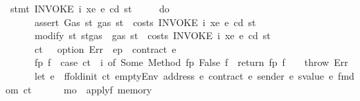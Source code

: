\begin{isabellebody}
{\isacharbar}{\kern0pt}\ {\isachardoublequoteopen}stmt\ {\isacharparenleft}{\kern0pt}INVOKE\ i\ xe{\isacharparenright}{\kern0pt}\ e\ cd\ st\ {\isacharequal}{\kern0pt}\isanewline
\ \ \ \ {\isacharparenleft}{\kern0pt}do\ {\isacharbraceleft}{\kern0pt}\isanewline
\ \ \ \ \ \ assert\ Gas\ {\isacharparenleft}{\kern0pt}{\isasymlambda}st{\isachardot}{\kern0pt}\ gas\ st\ {\isachargreater}{\kern0pt}\ costs\ {\isacharparenleft}{\kern0pt}INVOKE\ i\ xe{\isacharparenright}{\kern0pt}\ e\ cd\ st{\isacharparenright}{\kern0pt}{\isacharsemicolon}{\kern0pt}\isanewline
\ \ \ \ \ \ modify\ {\isacharparenleft}{\kern0pt}{\isasymlambda}st{\isachardot}{\kern0pt}\ st{\isasymlparr}gas\ {\isacharcolon}{\kern0pt}{\isacharequal}{\kern0pt}\ gas\ st\ {\isacharminus}{\kern0pt}\ costs\ {\isacharparenleft}{\kern0pt}INVOKE\ i\ xe{\isacharparenright}{\kern0pt}\ e\ cd\ st{\isasymrparr}{\isacharparenright}{\kern0pt}{\isacharsemicolon}{\kern0pt}\isanewline
\ \ \ \ \ \ {\isacharparenleft}{\kern0pt}ct{\isacharcomma}{\kern0pt}\ {\isacharunderscore}{\kern0pt}{\isacharparenright}{\kern0pt}\ {\isasymleftarrow}\ option\ Err\ {\isacharparenleft}{\kern0pt}{\isasymlambda}{\isacharunderscore}{\kern0pt}{\isachardot}{\kern0pt}\ ep\ {\isachardollar}{\kern0pt}{\isachardollar}{\kern0pt}\ contract\ e{\isacharparenright}{\kern0pt}{\isacharsemicolon}{\kern0pt}\isanewline
\ \ \ \ \ \ {\isacharparenleft}{\kern0pt}fp{\isacharcomma}{\kern0pt}\ f{\isacharparenright}{\kern0pt}\ {\isasymleftarrow}\ case\ ct\ {\isachardollar}{\kern0pt}{\isachardollar}{\kern0pt}\ i\ of\ Some\ {\isacharparenleft}{\kern0pt}Method\ {\isacharparenleft}{\kern0pt}fp{\isacharcomma}{\kern0pt}\ False{\isacharcomma}{\kern0pt}\ f{\isacharparenright}{\kern0pt}{\isacharparenright}{\kern0pt}\ {\isasymRightarrow}\ return\ {\isacharparenleft}{\kern0pt}fp{\isacharcomma}{\kern0pt}\ f{\isacharparenright}{\kern0pt}\ {\isacharbar}{\kern0pt}\ {\isacharunderscore}{\kern0pt}\ {\isasymRightarrow}\ throw\ Err{\isacharsemicolon}{\kern0pt}\isanewline
\ \ \ \ \ \ let\ e{\isacharprime}{\kern0pt}\ {\isacharequal}{\kern0pt}\ ffold{\isacharunderscore}{\kern0pt}init\ ct\ {\isacharparenleft}{\kern0pt}emptyEnv\ {\isacharparenleft}{\kern0pt}address\ e{\isacharparenright}{\kern0pt}\ {\isacharparenleft}{\kern0pt}contract\ e{\isacharparenright}{\kern0pt}\ {\isacharparenleft}{\kern0pt}sender\ e{\isacharparenright}{\kern0pt}\ {\isacharparenleft}{\kern0pt}svalue\ e{\isacharparenright}{\kern0pt}{\isacharparenright}{\kern0pt}\ {\isacharparenleft}{\kern0pt}fmdom\ ct{\isacharparenright}{\kern0pt}{\isacharsemicolon}{\kern0pt}\isanewline
\ \ \ \ \ \ m\isactrlsub o\ {\isasymleftarrow}\ applyf\ memory{\isacharsemicolon}{\kern0pt}\isanewline

\end{isabellebody}
